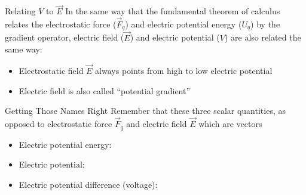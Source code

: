 \documentclass[12pt,aspectratio=169]{beamer}
\begin{document}
\begin{frame}{Relating $V$ to $\vec E$}
  In the same way that the fundamental theorem of calculus relates the 
  electrostatic force ($\vec F_q$) and electric potential energy ($U_q$) by the
  gradient operator, electric field ($\vec E$) and electric potential ($V$) are
  also related the same way:

  \begin{itemize}
  \item Electrostatic field $\vec E$ always points from high to low electric
    potential
  \item Electric field is also called ``potential gradient''
  \end{itemize}
\end{frame}




\begin{frame}{Getting Those Names Right}
  Remember that these three scalar quantities, as opposed to electrostatic
  force $\vec F_q$ and electric field $\vec E$ which are vectors
  \begin{itemize}
  \item Electric potential energy:
    
  \item Electric potential:

  \item Electric potential difference (voltage):

  \end{itemize}
\end{frame}



%
%    
\end{document}
